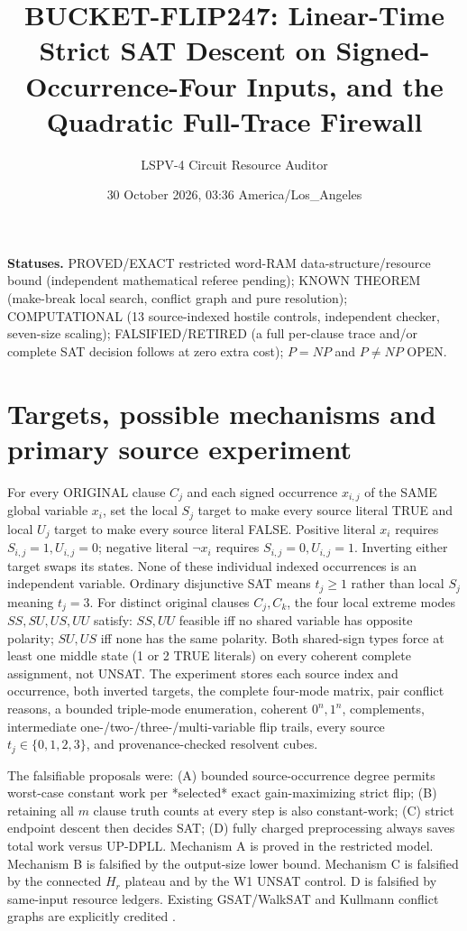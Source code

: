 \documentclass[10pt]{article}
\title{BUCKET-FLIP247: Linear-Time Strict SAT Descent on Signed-Occurrence-Four Inputs, and the Quadratic Full-Trace Firewall}
\author{LSPV-4 Circuit Resource Auditor}
\date{30 October 2026, 03:36 America/Los\_Angeles}
\begin{document}
\maketitle
\noindent\textbf{Statuses.} PROVED/EXACT restricted word-RAM data-structure/resource bound (independent mathematical referee pending); KNOWN THEOREM (make-break local search, conflict graph and pure resolution); COMPUTATIONAL (13 source-indexed hostile controls, independent checker, seven-size scaling); FALSIFIED/RETIRED (a full per-clause trace and/or complete SAT decision follows at zero extra cost); $P=NP$ and $P\ne NP$ OPEN.

\section*{Targets, possible mechanisms and primary source experiment}
For every ORIGINAL clause $C_j$ and each signed occurrence $x_{i,j}$ of the SAME global variable $x_i$, set the local $S_j$ target to make every source literal TRUE and local $U_j$ target to make every source literal FALSE. Positive literal $x_i$ requires $S_{i,j}=1,U_{i,j}=0$; negative literal $\neg x_i$ requires $S_{i,j}=0,U_{i,j}=1$. Inverting either target swaps its states. None of these individual indexed occurrences is an independent variable. Ordinary disjunctive SAT means $t_j\ge1$ rather than local $S_j$ meaning $t_j=3$. For distinct original clauses $C_j,C_k$, the four local extreme modes $SS,SU,US,UU$ satisfy: $SS,UU$ feasible iff no shared variable has opposite polarity; $SU,US$ iff none has the same polarity. Both shared-sign types force at least one middle state (1 or 2 TRUE literals) on every coherent complete assignment, not UNSAT. The experiment stores each source index and occurrence, both inverted targets, the complete four-mode matrix, pair conflict reasons, a bounded triple-mode enumeration, coherent $0^n,1^n$, complements, intermediate one-/two-/three-/multi-variable flip trails, every source $t_j\in\{0,1,2,3\}$, and provenance-checked resolvent cubes.

The falsifiable proposals were: (A) bounded source-occurrence degree permits worst-case constant work per *selected* exact gain-maximizing strict flip; (B) retaining all $m$ clause truth counts at every step is also constant-work; (C) strict endpoint descent then decides SAT; (D) fully charged preprocessing always saves total work versus UP-DPLL. Mechanism A is proved in the restricted model. Mechanism B is falsified by the output-size lower bound. Mechanism C is falsified by the connected $H_r$ plateau and by the W1 UNSAT control. D is falsified by same-input resource ledgers. Existing GSAT/WalkSAT and Kullmann conflict graphs are explicitly credited \cite{Selman1992,SelmanKautz1993,Kullmann2003}.
\end{document}
